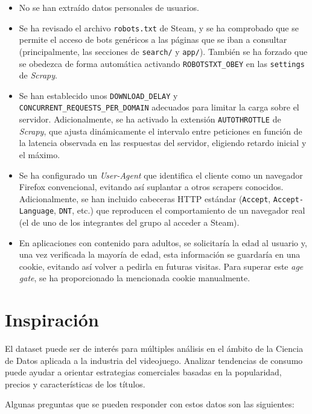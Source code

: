 \documentclass[
]{article}
\begin{document}
\begin{itemize}[itemsep=-4pt]
  \item No se han extraído datos personales de usuarios.
  \item Se ha revisado el archivo \texttt{robots.txt} de Steam, y se ha comprobado que se permite el acceso de bots genéricos a las páginas que se iban a consultar (principalmente, las secciones de \texttt{search/} y \texttt{app/}). También se ha forzado que se obedezca de forma automática activando \texttt{ROBOTSTXT\_OBEY} en las \texttt{settings} de \textit{Scrapy}.
  \item Se han establecido unos \texttt{DOWNLOAD\_DELAY} y \texttt{CONCURRENT\_REQUESTS\_PER\_DOMAIN} adecuados para limitar la carga sobre el servidor. Adicionalmente, se ha activado la extensión \texttt{AUTOTHROTTLE} de \textit{Scrapy}, que ajusta dinámicamente el intervalo entre peticiones en función de la latencia observada en las respuestas del servidor, eligiendo retardo inicial y el máximo.
\item Se ha configurado un \textit{User-Agent} que identifica el cliente como un navegador Firefox convencional, evitando así suplantar a otros scrapers conocidos. Adicionalmente, se han incluido cabeceras HTTP estándar (\texttt{Accept}, \texttt{Accept-Language}, \texttt{DNT}, etc.) que reproducen el comportamiento de un navegador real (el de uno de los integrantes del grupo al acceder a Steam).
  \item En aplicaciones con contenido para adultos, se solicitaría la edad al usuario y, una vez verificada la mayoría de edad, esta información se guardaría en una cookie, evitando así volver a pedirla en futuras visitas. Para superar este \textit{age gate}, se ha proporcionado la mencionada cookie manualmente.
\end{itemize}

\section{Inspiración}\label{inspiraciuxf3n}

El dataset puede ser de interés para múltiples análisis en el ámbito de la Ciencia de Datos aplicada a la industria del videojuego. Analizar tendencias de consumo puede ayudar a orientar estrategias comerciales basadas en la popularidad, precios y características de los títulos. 
\vspace{0.2cm}

Algunas preguntas que se pueden responder con estos datos son las siguientes:
\end{document}
